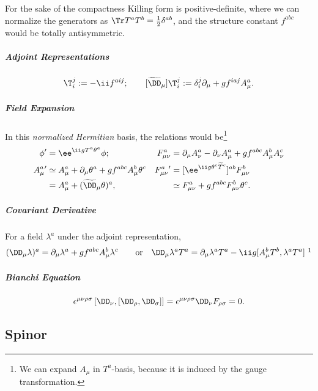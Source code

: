 For the sake of the compactness Killing form is positive-definite, where we can normalize the generators as $\Tr T^aT^b=\frac12\delta^{ab}$, and the structure constant $f^{abc}$ would be totally antisymmetric.

\subparagraph{Adjoint Representations}
\begin{equation}
 [\tilde T^a]\T_i^j:=-\ii f^{aij};\qquad
[\tilde\Dm]\T_i^j:=\delta_i^j\Pm+gf^{iaj}A^a_\mu.
\end{equation}

\subparagraph{Field Expansion}
In this {\em normalized Hermitian} basis, the relations would be\footnote{We can expand $A_\mu$ in $T^a$-basis, because it is induced by the gauge transformation.}
\begin{align*}
\phi'&=\ee^{\ii gT^a\theta^a}\phi;&
F_{\mu\nu}^a  &= \Pm A_\nu^a-\Pn A_\mu^a + gf^{abc}A_\mu^bA_\nu^c\\
A_\mu^a{}'&\simeq A_\mu^a+\Pm\theta^a+gf^{abc}A_\mu^b\theta^c&
F^a_{\mu\nu}{}'&=[\ee^{\ii g\theta^c\tilde T^c}]^{ab}F^b_{\mu\nu}\\
         &=A_\mu^a+(\tilde\Dm\theta)^a,&
&\simeq F_{\mu\nu}^a+gf^{abc}F^b_{\mu\nu}\theta^c.
\end{align*}

\subparagraph{Covariant Derivative}
For a field $\lambda^a$ under the adjoint representation,
\begin{equation}
 (\Dm\lambda)^a   = \Pm\lambda^a    + g f^{abc} A_\mu^b \lambda^c\qquad\text{or}\quad
  \Dm\lambda^aT^a = \Pm\lambda^aT^a - \ii g [A_\mu^bT^b,\lambda^aT^a]\ \footnotemark
\end{equation}

\subparagraph{Bianchi Equation}
\begin{equation}
 \epsilon^{\mu\nu\rho\sigma}\left[\Dn,\left[\Dr,\Ds\right]\right] = \epsilon^{\mu\nu\rho\sigma}\Dn F_{\rho\sigma} = 0.
\end{equation}

\newpage







\subsection{Spinor}
